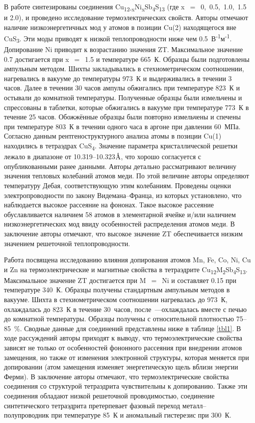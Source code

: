 В работе \cite{Suekuni_2013} синтезированы  соединения Cu\textsubscript{12-x}Ni\textsubscript{x}Sb\textsubscript{4}S\textsubscript{13} (где x~$=$~0,~0.5,~1.0,~1.5 и 2.0), и проведено исследование термоэлектрических свойств. Авторы отмечают наличие низкоэнергетичных мод у атомов в позиции Cu(2) находящегося вне CuS\textsubscript{3}. Эти моды приводят к низкой теплопроводности ниже чем 0.5~В\textsuperscript{-1}м\textsuperscript{-1}. Допирование Ni приводит к возрастанию значения ZT. Максимальное значение 0.7 достигается при x~$=$~1.5 и температуре 665~К. Образцы были подготовлены ампульным методом. Шихты закладывались в стехиометрическом соотношении, нагревались в вакууме до температуры 973~К и выдерживались в течении 3 часов. Далее в течении 30 часов ампулы обжигались при температуре 823~К и остывали до комнатной температуры. Полученные образцы были измельчены и спрессованы в таблетки, которые обжигались в вакууме при температуре 773~К в течение 25 часов. Обожжённые образцы были повторно измельчены и спечены при температуре 803~К в течении одного часа в аргоне при давлении 60~МПа. Согласно данным рентгеноструктурного анализа атомы в позиции Cu(1) находились в тетраэдрах CuS\textsubscript{4}. Значение параметра кристаллической решетки лежало в диапазоне от 10.319--10.323$\mbox{\normalfont\AA}$, что хорошо согласуется с опубликованными ранее данными. Авторы детально рассматривают величину значения тепловых колебаний атомов меди. По этой величине авторы определяют температуру Дебая, соответствующую этим колебаниям. Проведены оценки электропроводности по закону Видемана--Франца, из которых установлено, что наблюдается высокое рассеяние на фононах. Такое высокое рассеяние обуславливается наличием 58 атомов в элементарной ячейке и/или наличием низкоэнергетических мод ввиду особенностей распределения атомов меди. В заключение авторы отмечают, что высокое значение ZT обеспечивается низким значением решеточной теплопроводности.

Работа \cite{Suekuni2012} посвящена исследованию влияния допирования атомов Mn, Fe, Co, Ni, Cu и Zn на термоэлектрические и магнитные свойства в тетраэдрите Cu\textsubscript{12}M\textsubscript{2}Sb\textsubscript{4}S\textsubscript{13}.
Максимальное значение ZT достигается при M~$=$~Ni и составляет 0.15 при температуре 340~К.
Образцы получены стандартным ампульным методов в вакууме. Шихта в стехиометрическом соотношении нагревалась до 973~К, охлаждалась до 823~К в течение 30~часов, после~---охлаждалась вместе с печью до комнатной температуры.
Образцы получены с относительной плотностью 75--85~\%.
Сводные данные для соединений представлены ниже в таблице \ref{tbl1}.
В ходе рассуждений авторы приходят к выводу, что термоэлектрические свойства зависят не только от особенностей фононного рассеяния при внедрении атомов замещения, но также от изменения электронной структуры, которая меняется при допировании (атом замещения изменяет энергетическую щель вблизи энергии Ферми).
В заключение авторы отмечают, что термоэлектрические свойства соединения со структурой тетраэдрита чувствительны к допированию. Также эти соединения обладают низкой решеточной проводимостью, соединение синтетического тетраэдрита претерпевает фазовый переход металл--полупроводник при температуре 85~К и аномальный гистерезис при 300~К.


